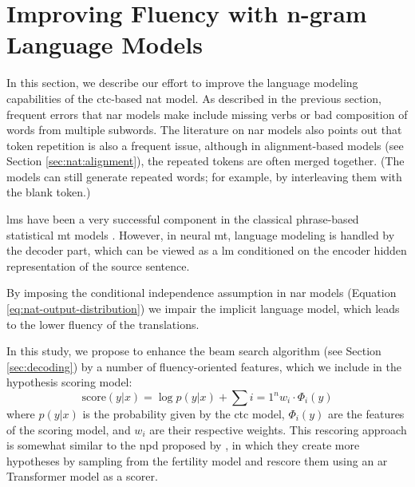 \section{Improving Fluency with n-gram Language Models}%
\label{sec:ctc:fluency}


\noindent
In this section, we describe our effort to improve the language modeling
capabilities of the \acs{ctc}-based \ac{nat} model. As described in the
previous section, frequent errors that \acl{nar} models make include missing
verbs or bad composition of words from multiple subwords. The literature on
\ac{nar} models also points out that token repetition is also a frequent issue,
although in alignment-based models (see Section \ref{sec:nat:alignment}), the
repeated tokens are often merged together. (The models can still generate
repeated words; for example, by interleaving them with the blank token.)

\Acp{lm} have been a very successful component in the classical phrase-based
statistical \acs{mt} models \citep{koehn2009statistical}. However, in neural
\acs{mt}, language modeling is handled by the decoder part, which can be viewed
as a \ac{lm} conditioned on the encoder hidden representation of the source
sentence.

By imposing the conditional independence assumption in \acl{nar} models
(Equation \ref{eq:nat-output-distribution}) we impair the implicit language
model, which leads to the lower fluency of the translations.

In this study, we propose to enhance the beam search algorithm (see Section
\ref{sec:decoding}) by a number of fluency-oriented features, which we include
in the hypothesis scoring model:
%
\begin{equation}
  \text{score}(y|x) = \log p(y|x) + \sum{i=1}^n w_i \cdot \Phi_i(y)
\end{equation}
%
where $p(y|x)$ is the probability given by the \acs{ctc} model, $\Phi_i(y)$ are
the features of the scoring model, and $w_i$ are their respective weights. This
rescoring approach is somewhat similar to the \ac{npd} proposed by
\citet{gu2017nonautoregressive}, in which they create more hypotheses by
sampling from the fertility model and rescore them using an \ac{ar} Transformer
model as a scorer.

